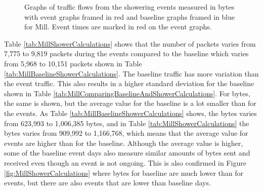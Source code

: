 \begin{figure}[H]
\begin{subfigure}[b]{0.47\textwidth}
    \end{subfigure}
        \begin{subfigure}[b]{0.47\textwidth}
        \centering
    \end{subfigure}
    \begin{subfigure}[b]{0.47\textwidth}
        \centering
    \end{subfigure}
    \begin{subfigure}[b]{0.47\textwidth}
        \centering
    \end{subfigure}
    \hspace{0.6cm}
    \begin{subfigure}[b]{0.47\textwidth}
    \centering
        \end{subfigure}
    \caption{Graphs of traffic flows from the showering events measured in bytes with event graphs framed in red and baseline graphs framed in blue for Mill. Event times are marked in red on the event graphs.}  
    \label{fig:MillShowerBytes2}
\end{figure}

Table \ref{tab:MillShowerCalculations} shows that the number of packets varies from 7,775 to 9,819 packets during the events compared to the baseline which varies from 5,968 to 10,151 packets shown in Table \ref{tab:MillBaselineShowerCalculations}. The baseline traffic has more variation than the event traffic. This also results in a higher standard deviation for the baseline shown in Table \ref{tab:MillComparingBaselineAndShowerCalculations}. For bytes, the same is shown, but the average value for the baseline is a lot smaller than for the events. As Table \ref{tab:MillBaselineShowerCalculations} shows, the bytes varies from 623,993 to 1,006,385 bytes, and in Table \ref{tab:MillShowerCalculations} the bytes varies from 909,992 to 1,166,768, which means that the average value for events are higher than for the baseline. Although the average value is higher, some of the baseline event days also measure similar amounts of bytes sent and received even though an event is not ongoing. This is also confirmed in Figure \ref{fig:MillShowerCalculations} where bytes for baseline are much lower than for events, but there are also events that are lower than baseline days. 

